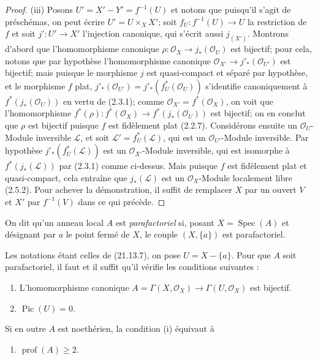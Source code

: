 \begin{proof}
(iii) Posons $U'=X'-Y'=f^{-1}(U)$ et notons que puisqu'il s'agit de préschémas, on
peut écrire $U'=U\times_X X'$; soit $f_U:f^{-1}(U)\to U$ la restriction de $f$ et
soit $j':U'\to X'$ l'injection canonique, qui s'écrit aussi $j_{(X')}$. Montrons
d'abord que l'homomorphisme canonique
$\rho:\mathcal O_X\to j_*(\mathcal O_U)$ est bijectif; pour cela, notons que par
hypothèse l'homomorphisme canonique
$\mathcal O_{X'}\to j'_*(\mathcal O_{U'})$ est bijectif; mais puisque le morphisme
$j$ est quasi-compact et séparé par hypothèse, et le morphisme $f$ plat,
$j'_*(\mathcal O_{U'})=j'_*(f_U^*(\mathcal O_U))$ s'identifie canoniquement à
$f^*(j_*(\mathcal O_U))$ en vertu de (2.3.1); comme
$\mathcal O_{X'}=f^*(\mathcal O_X)$, on voit que l'homomorphisme
$f^*(\rho):f^*(\mathcal O_X)\to f^*(j_*(\mathcal O_U))$ est bijectif; on en conclut
que $\rho$ est bijectif puisque $f$ est fidèlement plat (2.2.7). Considérons ensuite
un $\mathcal O_U$-Module inversible $\mathscr L$, et soit
$\mathscr L'=f_U^*(\mathscr L)$, qui est un $\mathcal O_{U'}$-Module inversible. Par
hypothèse $j'_*(f_U^*(\mathscr L))$ est un $\mathcal O_{X'}$-Module inversible, qui
est isomorphe à $f^*(j_*(\mathscr L))$ par (2.3.1) comme ci-dessus. Mais puisque $f$
est fidèlement plat et quasi-compact, cela entraîne que $j_*(\mathscr L)$ est un
$\mathcal O_X$-Module localement libre (2.5.2). Pour achever la démonstration, il
suffit de remplacer $X$ par un ouvert $V$ et $X'$ par $f^{-1}(V)$ dans ce qui
précède.
\end{proof}

\begin{definition}[21.13.7]
\label{IV.21.13.7}
On dit qu'un anneau local $A$ est \emph{parafactoriel} si, posant
$X=\operatorname{Spec}(A)$ et désignant par $a$ le point fermé de $X$, le couple
$(X,\{a\})$ est parafactoriel.
\end{definition}

\begin{proposition}[21.13.8]
\label{IV.21.13.8}
Les notations étant celles de (21.13.7), on pose $U=X-\{a\}$. Pour que $A$ soit
parafactoriel, il faut et il suffit qu'il vérifie les conditions suivantes :
\begin{enumerate}[label=(\roman*)]
  \item L'homomorphisme canonique
  $A=\Gamma(X,\mathcal O_X)\to\Gamma(U,\mathcal O_X)$ est bijectif.
  \item $\operatorname{Pic}(U)=0$.
\end{enumerate}
Si en outre $A$ est noethérien, la condition (i) équivaut à
\begin{enumerate}
  \item[\textup{(i bis)}] $\operatorname{prof}(A)\geq2$.
\end{enumerate}
\end{proposition}

